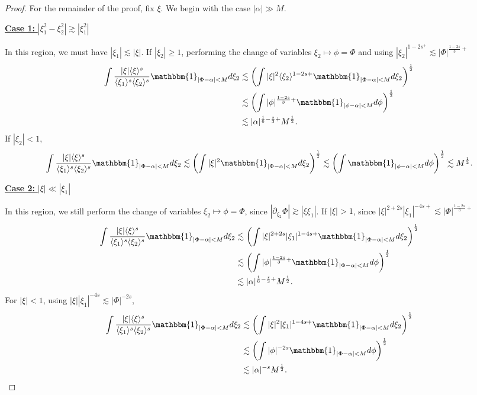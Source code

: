 \documentclass[%
11pt,  reqno]{amsart}
\newcommand{\fia}{\mathbbm{1}_{|\Phi-\alpha|<M}}
\newcommand{\jap}[1]{\langle #1 \rangle}
\newcommand{\5}{\textup{V}}
\newcommand{\noi}{\noindent}
\theoremstyle{remark}
\numberwithin{equation}{section}
\numberwithin{theorem}{section}
\begin{document}
\begin{proof}
For the remainder of the proof, fix $\xi$. We begin with the case $|\alpha|\gg M$.

\smallskip

\noi
\underline{
\textbf{Case 1:} $|\xi_1^2-\xi_2^2| \gtrsim |\xi_1^2|$}

In this region, we must have $|\xi_1|\lesssim |\xi|$. If $|\xi_2|\ge 1$, performing the change of variables $\xi_2\mapsto \phi=\Phi$ and using $|\xi_2|^{1-2s^+}\lesssim |\Phi|^{\frac{1-2s}{3}+}$
\begin{align*}
     \int \frac{|\xi|\jap{\xi}^s}{\jap{\xi_1}^s\jap{\xi_2}^s}\fia d\xi_2 &\lesssim \left(\int |\xi|^2\jap{\xi_2}^{1-2s+}\fia d\xi_2\right)^\frac12\\&\lesssim \left(\int |\phi|^{\frac{1-2s}{3}+}\mathbbm{1}_{|\phi-\alpha|<M} d\phi\right)^\frac12\\&\lesssim |\alpha|^{\frac16 - \frac s3 +} M^{\frac12}.
\end{align*}
If $|\xi_2|<1$,
\begin{align*}
     \int \frac{|\xi|\jap{\xi}^s}{\jap{\xi_1}^s\jap{\xi_2}^s}\fia d\xi_2 \lesssim \left(\int |\xi|^2\fia d\xi_2\right)^\frac12\lesssim \left(\int \mathbbm{1}_{|\phi-\alpha|<M} d\phi\right)^\frac12\lesssim M^{\frac12}.
\end{align*}

\smallskip

\noi
\underline{ 
\textbf{Case 2:} $|\xi| \ll |\xi_1|$} 

In this region, we still perform the change of variables $\xi_2\mapsto \phi=\Phi$, since $|\partial_{\xi_2}\Phi|\gtrsim |\xi\xi_1|$. If $|\xi|>1$, since $|\xi|^{2+2s}|\xi_1|^{-4s+}\lesssim |\Phi|^{\frac{1-2s}{3}+} $
\begin{align*}
    \int \frac{|\xi|\jap{\xi}^s}{\jap{\xi_1}^s\jap{\xi_2}^s}\fia d\xi_2 &\lesssim \left(\int |\xi|^{2+2s}|\xi_1|^{1-4s+}\fia d\xi_2\right)^\frac12\\& \lesssim \left(\int |\phi|^{\frac{1-2s}{3}+}\fia d\phi\right)^\frac12\\&\lesssim |\alpha|^{\frac16 - \frac s3 +} M^{\frac12}.
\end{align*}
For $|\xi|<1$, using $|\xi||\xi_1|^{-4s}\lesssim |\Phi|^{-2s}$,
\begin{align*}
    \int \frac{|\xi|\jap{\xi}^s}{\jap{\xi_1}^s\jap{\xi_2}^s}\fia d\xi_2 &\lesssim \left(\int |\xi|^{2}|\xi_1|^{1-4s+}\fia d\xi_2\right)^\frac12\\& \lesssim \left(\int |\phi|^{-2s}\fia d\phi\right)^\frac12\\&\lesssim |\alpha|^{-s} M^{\frac12}.
\end{align*}




\end{proof}
\end{document}
